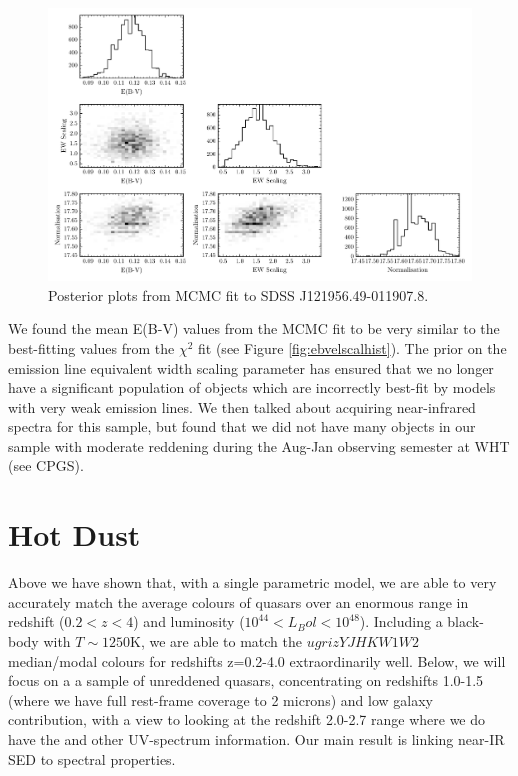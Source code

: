\begin{figure}
  \centering
  \includegraphics[width=\textwidth]{figures/chapter06/posteriors.pdf}
  \caption{Posterior plots from MCMC fit to SDSS J121956.49-011907.8.}
  \label{fig:posteriorplot}
\end{figure}

We found the mean E(B-V) values from the MCMC fit to be very similar to the best-fitting values from the $\chi^2$ fit (see Figure \ref{fig:ebvelscalhist}). 
The prior on the emission line equivalent width scaling parameter has ensured that we no longer have a significant population of objects which are incorrectly best-fit by models with very weak emission lines.
We then talked about acquiring near-infrared spectra for this sample, but found that we did not have many objects in our sample with moderate reddening during the Aug-Jan observing semester at WHT (see CPGS). 

\section{Hot Dust}

Above we have shown that, with a single parametric model, we are able to very accurately match the average colours of quasars over an enormous range in redshift ($0.2 < z < 4$) and luminosity ($10^44 < L_Bol < 10^48$\ergs). 
Including a black-body with $T\sim1250$K, we are able to match the $ugrizYJHKW1W2$ median/modal colours for redshifts z=0.2-4.0 extraordinarily well. 
Below, we will focus on a a sample of unreddened quasars, concentrating on redshifts 1.0-1.5 (where we have full rest-frame coverage to 2 microns) and low galaxy contribution, with a view to looking at the redshift 2.0-2.7 range where we do have the  and other UV-spectrum information. 
Our main result is linking near-IR SED to spectral properties.

